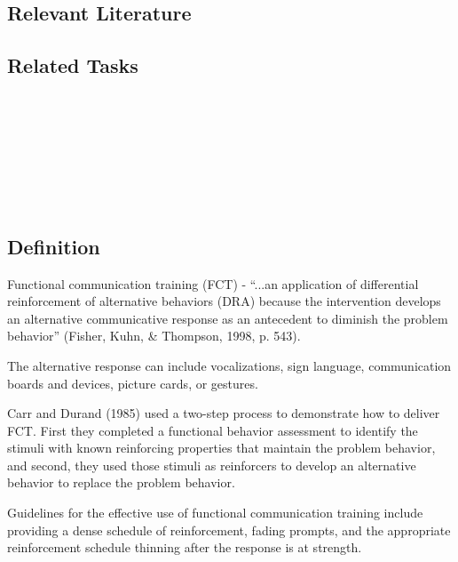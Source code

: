 \subsection{Relevant Literature}
\begin{refsection}
\nocite{cooper2007applied,
        cowdery1990effects,
        deitz1977analysis,
        deitz1983reducing,
        hanley2001reinforcement,
        kahng2001assessment,
        lalli1995reducing,
        lindberg1999dro,
        mazaleski1993analysis,
        petscher2009review,
        rehfeldt2003functional,
        seys1978improving,
        vollmer1992differential,
        vollmer1999evaluating}
\printbibliography[heading=none]
\end{refsection}
\subsection{Related Tasks} 
\fourcOne{}\\
\fourdTwo{}\\
\fourdNineteen{}\\
\fourfSeven{}\\
\fouriSeven{}\\
\fourjTwo{}\\
%
\clearpage \section{\fourfSeven{}}
\subsection{Definition}
Functional communication training (FCT) - ``...an application of differential reinforcement of alternative behaviors (DRA) because the intervention develops an alternative communicative response as an antecedent to diminish the problem behavior'' (Fisher, Kuhn, \& Thompson, 1998, p. 543).

The alternative response can include vocalizations, sign language, communication boards and devices, picture cards, or gestures.

Carr and Durand (1985) used a two-step process to demonstrate how to deliver FCT.  First they completed a functional behavior assessment to identify the stimuli with known reinforcing properties that maintain the problem behavior, and second, they used those stimuli as reinforcers to develop an alternative behavior to replace the problem behavior.

Guidelines for the effective use of functional communication training include providing a dense schedule of reinforcement, fading prompts, and the appropriate reinforcement schedule thinning after the response is at strength.
%
